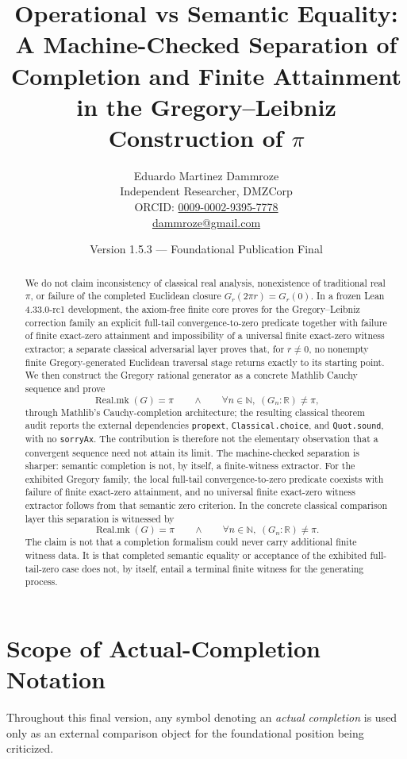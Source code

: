 \documentclass[11pt,a4paper]{article}
\title{Operational vs Semantic Equality:
A Machine-Checked Separation of Completion and Finite Attainment
in the Gregory--Leibniz Construction of \(\pi\)}
\author{
Eduardo Martinez Dammroze\\
Independent Researcher, DMZCorp\\
ORCID: \href{https://orcid.org/0009-0002-9395-7778}{0009-0002-9395-7778}\\
\href{mailto:dammroze@gmail.com}{dammroze@gmail.com}
}
\date{Version 1.5.3 --- Foundational Publication Final}
\begin{document}
\maketitle


\begin{abstract}
We do not claim inconsistency of classical real analysis, nonexistence
of traditional real \(\pi\), or failure of the completed Euclidean
closure \(G_r(2\pi r)=G_r(0)\).
In a frozen Lean 4.33.0-rc1 development, the axiom-free finite core
proves for the Gregory--Leibniz correction family an explicit full-tail
convergence-to-zero predicate together with failure of finite
exact-zero attainment and impossibility of a universal finite
exact-zero witness extractor; a separate classical adversarial layer
proves that, for \(r\neq0\), no nonempty finite Gregory-generated
Euclidean traversal stage returns exactly to its starting point.
We then construct the Gregory rational generator as a concrete Mathlib
Cauchy sequence and prove
\[
\operatorname{Real.mk}(G)=\pi
\qquad\land\qquad
\forall n\in\mathbb N,\;(G_n:\mathbb R)\neq\pi,
\]
through Mathlib's Cauchy-completion architecture; the resulting
classical theorem audit reports the external dependencies
\texttt{propext}, \texttt{Classical.choice}, and \texttt{Quot.sound},
with no \texttt{sorryAx}.
The contribution is therefore not the elementary observation that a
convergent sequence need not attain its limit.  The machine-checked
separation is sharper: semantic completion is not, by itself, a
finite-witness extractor.  For the exhibited Gregory family, the local
full-tail convergence-to-zero predicate coexists with failure of
finite exact-zero attainment, and no universal finite exact-zero
witness extractor follows from that semantic zero criterion.  In the
concrete classical comparison layer this separation is witnessed by
\[
\operatorname{Real.mk}(G)=\pi
\qquad\land\qquad
\forall n\in\mathbb N,\;(G_n:\mathbb R)\neq\pi.
\]
The claim is not that a completion formalism could never carry
additional finite witness data.  It is that completed semantic
equality or acceptance of the exhibited full-tail-zero case does not,
by itself, entail a terminal finite witness for the generating
process.
\end{abstract}


\section*{Scope of Actual-Completion Notation}

Throughout this final version, any symbol denoting an
\emph{actual completion} is used only as an external comparison object
for the foundational position being criticized.
\end{document}
